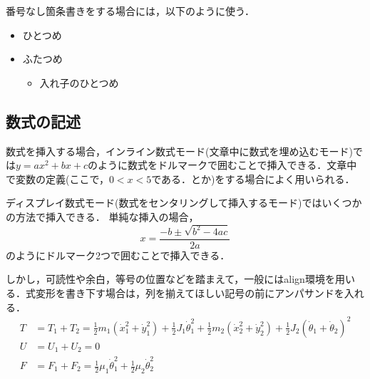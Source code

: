 番号なし箇条書きをする場合には，以下のように使う．
\begin{itemize}
    \item ひとつめ
    \item ふたつめ
    \begin{itemize}
        \item 入れ子のひとつめ
    \end{itemize}
\end{itemize}

\subsection{数式の記述}\label{sec:数式}
数式を挿入する場合，インライン数式モード(文章中に数式を埋め込むモード)では$y=ax^{2}+bx+c$のように数式をドルマークで囲むことで挿入できる．文章中で変数の定義(ここで，$0<x<5$である．とか)をする場合によく用いられる．

ディスプレイ数式モード(数式をセンタリングして挿入するモード)ではいくつかの方法で挿入できる．
単純な挿入の場合，$$x=\frac{-b\pm\sqrt{b^{2}-4ac}}{2a}$$のようにドルマーク2つで囲むことで挿入できる．

しかし，可読性や余白，等号の位置などを踏まえて，一般にはalign環境を用いる．式変形を書き下す場合は，列を揃えてほしい記号の前にアンパサンドを入れる．
\begin{align}
	T &= T_{1} + T_{2} = \frac{1}{2}m_{1}\left(\dot x_{1}^{2} + \dot y_{1}^{2}\right) + \frac{1}{2}J_{1}\dot\theta_{1}^{2} + \frac{1}{2}m_{2}\left(\dot x_{2}^{2} + \dot y_{2}^{2}\right) + \frac{1}{2}J_{2}\left(\dot\theta_{1} + \dot\theta_{2}\right)^{2} \label{eq:T}\\
	U &= U_{1} + U_{2} = 0 \label{eq:U}\\
	F &= F_{1} + F_{2} = \frac{1}{2}\mu_{1}\dot\theta_{1}^{2}  + \frac{1}{2}\mu_{2}\dot\theta_{2}^{2} \label{eq:F}
\end{align}

